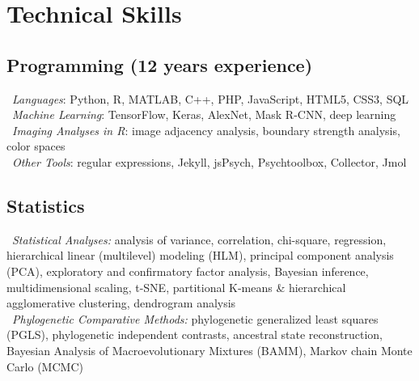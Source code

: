 \section*{Technical Skills}
\subsection*{Programming (12 years experience)}
\textendash\ \textit{Languages}: Python, R, MATLAB, C++, PHP, JavaScript, HTML5, CSS3, SQL\\
\textendash\ \textit{Machine Learning}: TensorFlow, Keras, AlexNet, Mask R-CNN, deep learning\\
\textendash\ \textit{Imaging Analyses in R}: image adjacency analysis, boundary strength analysis, color spaces\\
\textendash\ \textit{Other Tools}: regular expressions, Jekyll, jsPsych, Psychtoolbox, Collector, Jmol

\subsection*{Statistics}
\textendash\ \textit{Statistical Analyses:} analysis of variance, correlation, chi-square, regression, hierarchical linear (multilevel) modeling (HLM), principal component analysis (PCA), exploratory and confirmatory factor analysis, Bayesian inference, multidimensional scaling, t-SNE, partitional K-means \& hierarchical agglomerative clustering, dendrogram analysis\\
\textendash\ \textit{Phylogenetic Comparative Methods:} phylogenetic generalized least squares (PGLS), phylogenetic independent contrasts, ancestral state reconstruction, Bayesian Analysis of Macroevolutionary Mixtures (BAMM), Markov chain Monte Carlo (MCMC)